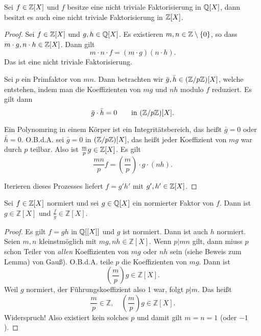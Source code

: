 \documentclass[
 a4paper,
 12pt,
 parskip=half
 ]{scrreprt}
\theoremstyle{plain}
\theoremstyle{definition}
\newcommand{\gzz}{\mathbb{Z}}
\numberwithin{equation}{chapter}
\numberwithin{thm}{chapter}
\begin{document}
\begin{lem}[Gauss]
  Sei $f \in \mathbb{Z}[X]$ und $f$ besitze eine nicht triviale Faktorisierung in
  $\mathbb{Q}[X]$, dann besitzt es auch eine nicht triviale Faktorisierung in
  $\mathbb{Z}[X]$. 
\end{lem}

\begin{proof}
  Sei $f \in \mathbb{Z}[X]$ und $g,h \in \mathbb{Q}[X]$. Es existieren $m,n \in \mathbb{Z}
  \setminus \{0\}$, so dass  $m \cdot g, n \cdot h \in \mathbb{Z}[X]$. Dann gilt
  \[ m \cdot n \cdot f = (m \cdot g)(n \cdot h). \]
  Das ist eine nicht triviale Faktorisierung.

  Sei $p$ ein Primfaktor von $mn$. Dann betrachten wir $\bar{g}, \bar{h} \in
  (\mathbb{Z} / p \mathbb{Z})[X]$, welche entstehen, indem man die Koeffizienten von $mg$ und $nh$
  modulo $f$ reduziert. Es gilt dann
  \[ \bar{g} \cdot \bar{h} = 0 \qquad \text{in } (\mathbb{Z} / p \mathbb{Z})[X]. \]

  Ein Polynomring in einem Körper ist ein Integritätsbereich, das heißt $\bar{g}
  = 0$ oder $\bar{h} = 0$. O.B.d.A. sei $\bar{g} = 0$ in $(\mathbb{Z} / p \mathbb{Z})[X]$, das
  heißt jeder Koeffizient von $mg$ war durch $p$ teilbar. Also ist $\frac{m}{p}
  g \in \mathbb{Z}[X]$. Es gilt
  \[ \frac{mn}{p} f = \left( \frac{m}{p} \right) \cdot g \cdot (nh). \]

  Iterieren dieses Prozesses liefert $f = g' h'$ mit $g', h' \in \mathbb{Z}[X]$.
\end{proof}

\begin{kor}
  Sei $f \in \mathbb{Z}[X]$ normiert und sei $g \in \mathbb{Q}[X]$ ein normierter Faktor
  von $f$. Dann ist $g \in \gzz[X]$ und $\frac{f}{g} \in \gzz[X]$.
\end{kor}

\begin{proof}
  Es gilt $f = gh$ in $\mathbb{Q}[[X]]$ und $g$ ist normiert. Dann ist auch $h$
  normiert. Seien $m, n$ kleinstmöglich mit $mg, nh \in \gzz[X]$. Wenn $p | mn$
  gilt, dann miuss $p$ schon Teiler von \emph{allen} Koeffizienten von $mg$ oder
  $nh$ sein (siehe Beweis zum Lemma) von Gauß). O.B.d.A. teile $p$ die
  Koeffizienten von $mg$. Dann ist
  \[ \left( \frac{m}{p} \right) g \in \gzz[X]. \]
  Weil $g$ normiert, der Führungskoeffizient also 1 war, folgt $p | m$. Das
  heißt
  \[ \frac{m}{p} \in \gzz, \quad \left( \frac{m}{p} \right) g \in \gzz[X]. \]
  Widerspruch! Also existiert kein solches $p$ und damit gilt $m = n = 1$ (oder
  $-1$).
\end{proof}
\end{document}
